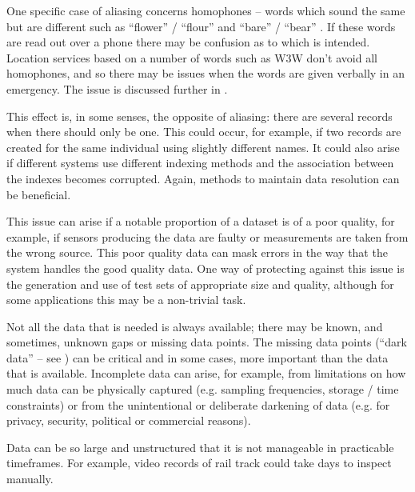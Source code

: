 \begin{description}
	One specific case of aliasing  concerns homophones -- words which sound the same but are different such as ``flower'' / ``flour'' and ``bare'' / ``bear'' \cite{citation:homonym}.
	If these words are read out over a phone there may be confusion as to which is intended.
	Location services based on a number of words such as W3W don't avoid all homophones,
	and so there may be issues when the words are given verbally in an emergency. The issue is discussed further in .
	
	\item[Disassociation:] This effect is, in some senses, the opposite of aliasing: there are several records when there should only be one. This could occur, for example, if two records are created for the same individual using slightly different names. It could also arise if different systems use different indexing methods and the association between the indexes becomes corrupted. Again, methods to maintain data resolution can be beneficial.
	
	\item[Masking:] This issue can arise if a notable proportion of a \gls{dataset} is of a poor \gls{quality}, for example, if sensors producing the data are faulty or measurements are taken from the wrong source. This poor quality data can mask errors in the way that the system handles the good quality data. One way of protecting against this issue is the generation and use of test sets of appropriate size and quality, although for some applications this may be a non-trivial task.
	
	\item[Incompleteness:] Not all the data that is needed is always available; there may be known, and sometimes, unknown gaps or missing data points. The missing data points (``dark data'' -- see )
	can be critical and in some cases, more important than the data that is available. Incomplete data can arise, for example, from limitations on how much data can be physically captured (e.g. sampling frequencies, storage / time constraints) or from the unintentional or deliberate darkening of data (e.g. for privacy, security, political or commercial reasons).
	
	\item[Volume:] Data can be so large and unstructured that it is not manageable in practicable timeframes.
	For example, video records of rail track could take days to inspect manually.
	

\end{description}
